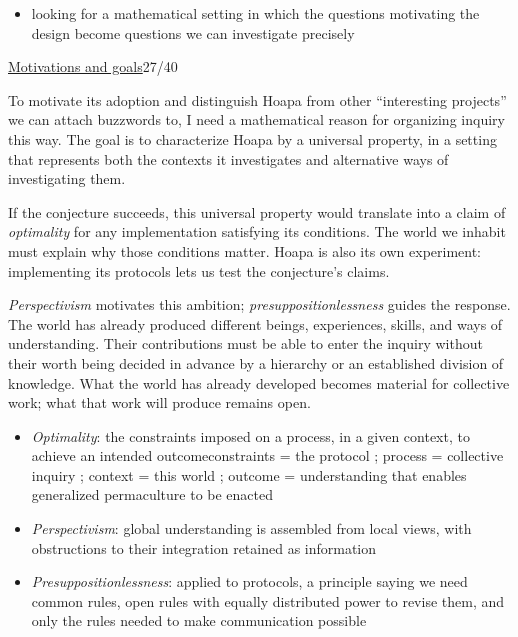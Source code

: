 \documentclass[a4paper,10pt]{article}
\newcommand{\slidehead}[2]{\par\addvspace{7pt}\noindent\underline{#1}\hfill{\color{gray}#2}\par\nopagebreak\vspace{1pt}}
\renewenvironment{leftbar}{%
  \def\FrameCommand{{\color{black!30}\vrule width 1.2pt}\hspace{6pt}}%
  \MakeFramed{\advance\hsize-\width \FrameRestore}}{\endMakeFramed}
\newenvironment{commentary}{\par\vspace{-2pt}\begin{leftbar}\color{black!80}}{\end{leftbar}}
\begin{document}
\begin{commentary}
\begin{itemize}
\item looking for a mathematical setting in which the questions motivating the design become questions we can investigate precisely
\end{itemize}
\end{commentary}
\slidehead{Motivations and goals}{27/40}
To motivate its adoption and distinguish Hoapa from other “interesting projects” we can attach buzzwords to, I need a mathematical reason for organizing inquiry this way. The goal is to characterize Hoapa by a universal property, in a setting that represents both the contexts it investigates and alternative ways of investigating them.\par
If the conjecture succeeds, this universal property would translate into a claim of \textcolor{optimalitygold}{\emph{optimality}} for any implementation satisfying its conditions. The world we inhabit must explain why those conditions matter. Hoapa is also its own experiment: implementing its protocols lets us test the conjecture's claims.\par
\textcolor{hoapaviolet}{\emph{Perspectivism}} motivates this ambition; \textcolor{presuppositionlessnessteal}{\emph{presuppositionlessness}} guides the response. The world has already produced different beings, experiences, skills, and ways of understanding. Their contributions must be able to enter the inquiry without their worth being decided in advance by a hierarchy or an established division of knowledge. What the world has already developed becomes material for collective work; what that work will produce remains open.\par
\begin{itemize}
\item \textcolor{optimalitygold}{\emph{Optimality}}: the constraints imposed on a process, in a given context, to achieve an intended outcome\newline constraints = the protocol ; process = collective inquiry ; context = this world ; outcome = understanding that enables generalized permaculture to be enacted
\item \textcolor{hoapaviolet}{\emph{Perspectivism}}: global understanding is assembled from local views, with obstructions to their integration retained as information
\item \textcolor{presuppositionlessnessteal}{\emph{Presuppositionlessness}}: applied to protocols, a principle saying we need common rules, open rules with equally distributed power to revise them, and only the rules needed to make communication possible
\end{itemize}
\end{document}
